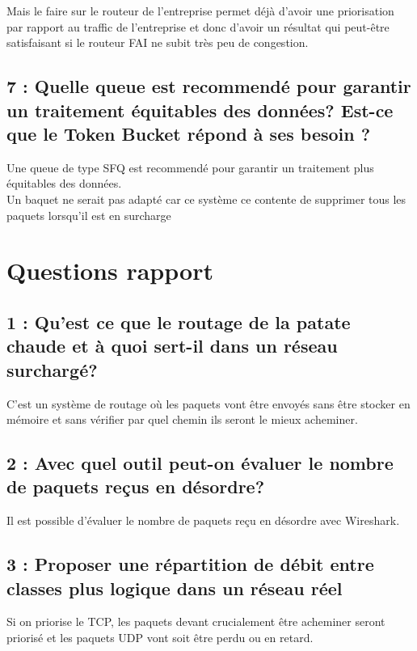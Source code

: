 \documentclass{article}
\begin{document}
Mais le faire sur le routeur de l'entreprise permet déjà d'avoir une priorisation par rapport au traffic de l'entreprise et donc d'avoir un résultat qui peut-être satisfaisant si le routeur FAI ne subit très peu de congestion.

\subsection*{7 : Quelle queue est recommendé pour garantir un traitement équitables des données? Est-ce que le Token Bucket répond à ses besoin ?}

Une queue de type SFQ \cite{SFQ} est recommendé pour garantir un traitement plus équitables des données.\\

Un baquet ne serait pas adapté car ce système ce contente de supprimer tous les paquets lorsqu'il est en surcharge \cite{Bucket}


\section{Questions rapport}

\subsection*{1 : Qu'est ce que le routage de la patate chaude et à quoi sert-il dans un réseau surchargé?}

C'est un système de routage où les paquets vont être envoyés sans être stocker en mémoire et sans vérifier par quel chemin ils seront le mieux acheminer. \cite{HotPotato}

\subsection*{2 : Avec quel outil peut-on évaluer le nombre de paquets reçus en désordre?}

Il est possible d'évaluer le nombre de paquets reçu en désordre avec Wireshark.


\subsection*{3 : Proposer une répartition de débit entre classes plus logique dans un réseau réel}

Si on priorise le TCP, les paquets devant crucialement être acheminer seront priorisé et les paquets UDP vont soit être perdu ou en retard. \\
\end{document}
